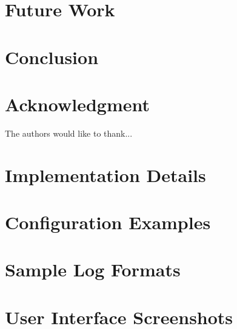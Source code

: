 \documentclass[conference]{IEEEtran}
\begin{document}
\section{Future Work}

\section{Conclusion}

\section*{Acknowledgment}
The authors would like to thank... %




\appendix
\section{Implementation Details}

\section{Configuration Examples}

\section{Sample Log Formats}

\section{User Interface Screenshots}
\end{document}
